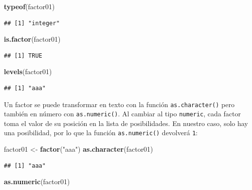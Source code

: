 \documentclass[
]{book}
\newenvironment{Shaded}{\begin{snugshade}}{\end{snugshade}}
\newcommand{\KeywordTok}[1]{\textcolor[rgb]{0.13,0.29,0.53}{\textbf{#1}}}
\newcommand{\NormalTok}[1]{#1}
\newcommand{\StringTok}[1]{\textcolor[rgb]{0.31,0.60,0.02}{#1}}
\begin{document}
\begin{Shaded}
\begin{Highlighting}[]
\KeywordTok{typeof}\NormalTok{(factor01)}
\end{Highlighting}
\end{Shaded}

\begin{verbatim}
## [1] "integer"
\end{verbatim}

\begin{Shaded}
\begin{Highlighting}[]
\KeywordTok{is.factor}\NormalTok{(factor01)}
\end{Highlighting}
\end{Shaded}

\begin{verbatim}
## [1] TRUE
\end{verbatim}

\begin{Shaded}
\begin{Highlighting}[]
\KeywordTok{levels}\NormalTok{(factor01)}
\end{Highlighting}
\end{Shaded}

\begin{verbatim}
## [1] "aaa"
\end{verbatim}

Un factor se puede transformar en texto con la función \texttt{as.character()} pero también en número con \texttt{as.numeric()}. Al cambiar al tipo \texttt{numeric}, cada factor toma el valor de su posición en la lista de posibilidades. En nuestro caso, solo hay una posibilidad, por lo que la función \texttt{as.numeric()} devolverá \texttt{1}:

\begin{Shaded}
\begin{Highlighting}[]
\NormalTok{factor01 <-}\StringTok{ }\KeywordTok{factor}\NormalTok{(}\StringTok{"aaa"}\NormalTok{)}
\KeywordTok{as.character}\NormalTok{(factor01)}
\end{Highlighting}
\end{Shaded}

\begin{verbatim}
## [1] "aaa"
\end{verbatim}

\begin{Shaded}
\begin{Highlighting}[]
\KeywordTok{as.numeric}\NormalTok{(factor01)}
\end{Highlighting}
\end{Shaded}
\end{document}
